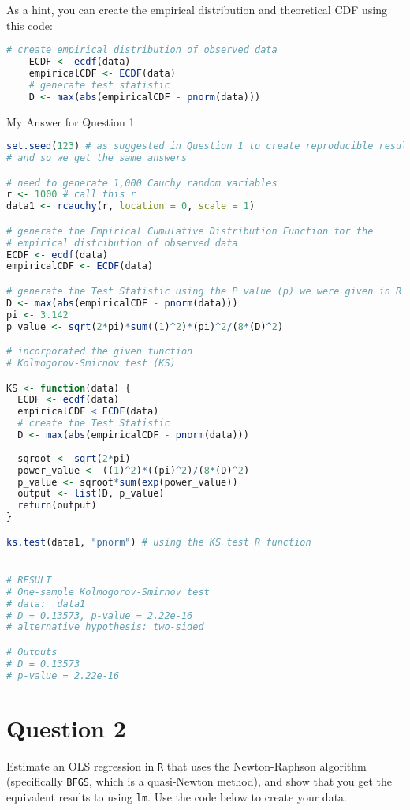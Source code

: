 \documentclass[12pt,letterpaper]{article}
\begin{document}
	
\noindent As a hint, you can create the empirical distribution and theoretical CDF using this code:

\begin{lstlisting}[language=R]
	# create empirical distribution of observed data
	ECDF <- ecdf(data)
	empiricalCDF <- ECDF(data)
	# generate test statistic
	D <- max(abs(empiricalCDF - pnorm(data))) \end{lstlisting}

	
\noindent My Answer for Question 1


\begin{lstlisting}[language=R]
	set.seed(123) # as suggested in Question 1 to create reproducible results
# and so we get the same answers

# need to generate 1,000 Cauchy random variables
r <- 1000 # call this r
data1 <- rcauchy(r, location = 0, scale = 1)

# generate the Empirical Cumulative Distribution Function for the
# empirical distribution of observed data
ECDF <- ecdf(data)
empiricalCDF <- ECDF(data)

# generate the Test Statistic using the P value (p) we were given in R 
D <- max(abs(empiricalCDF - pnorm(data)))
pi <- 3.142
p_value <- sqrt(2*pi)*sum((1)^2)*(pi)^2/(8*(D)^2)

# incorporated the given function 
# Kolmogorov-Smirnov test (KS)

KS <- function(data) {
  ECDF <- ecdf(data)
  empiricalCDF < ECDF(data)
  # create the Test Statistic
  D <- max(abs(empiricalCDF - pnorm(data)))
  
  sqroot <- sqrt(2*pi)
  power_value <- ((1)^2)*((pi)^2)/(8*(D)^2)
  p_value <- sqroot*sum(exp(power_value))
  output <- list(D, p_value)
  return(output)
}

ks.test(data1, "pnorm") # using the KS test R function


# RESULT
# One-sample Kolmogorov-Smirnov test
# data:  data1
# D = 0.13573, p-value = 2.22e-16
# alternative hypothesis: two-sided

# Outputs
# D = 0.13573
# p-value = 2.22e-16
\end{lstlisting}

\vspace{3in}


\section*{Question 2}
\noindent Estimate an OLS regression in \texttt{R} that uses the Newton-Raphson algorithm (specifically \texttt{BFGS}, which is a quasi-Newton method), and show that you get the equivalent results to using \texttt{lm}. Use the code below to create your data.
\vspace{.5cm}
 
\end{document}
